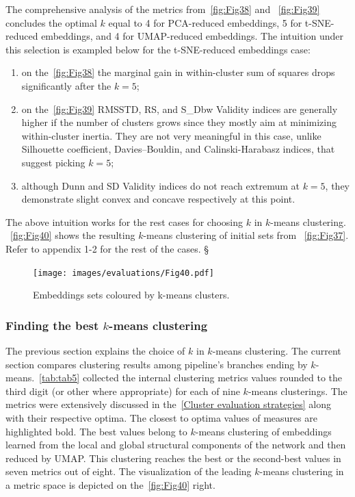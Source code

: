 The comprehensive analysis of the metrics from~\autoref{fig:Fig38} and ~\autoref{fig:Fig39} concludes the optimal $k$ equal to 4 for PCA-reduced embeddings, 5 for t-SNE-reduced embeddings, and 4 for UMAP-reduced embeddings. The intuition under this selection is exampled below for the t-SNE-reduced embeddings case:
\begin{enumerate}
    \item on the~\autoref{fig:Fig38} the marginal gain in within-cluster sum of squares drops significantly after the $k = 5$;
    \item on the~\autoref{fig:Fig39} RMSSTD, RS, and S\_Dbw Validity indices are generally higher if the number of clusters grows since they mostly aim at minimizing within-cluster inertia. They are not very meaningful in this case, unlike Silhouette coefficient, Davies–Bouldin, and Calinski-Harabasz indices, that suggest picking $k = 5$;
    \item although Dunn and SD Validity indices do not reach extremum at $k = 5$, they demonstrate slight convex and concave respectively at this point.
\end{enumerate}
The above intuition works for the rest cases for choosing $k$ in $k$-means clustering. ~\autoref{fig:Fig40} shows the resulting $k$-means clustering of initial sets from ~\autoref{fig:Fig37}. Refer to appendix 1-2 for the rest of the cases.  §
\begin{figure}[!ht]
	\centering
	\texttt{[image: images/evaluations/Fig40.pdf]}\\
	\caption{Embeddings sets coloured by k-means clusters.}
	\label{fig:Fig40}
\end{figure}
\subsubsection{Finding the best $k$-means clustering}
\label{Finding the best $k$-means clustering}
The previous section explains the choice of $k$ in $k$-means clustering. The current section compares clustering results among pipeline's branches ending by $k$-means.~\autoref{tab:tab5} collected the internal clustering metrics values rounded to the third digit (or other where appropriate) for each of nine $k$-means clusterings. The metrics were extensively discussed in the~\ref{Cluster evaluation strategies} along with their respective optima. The closest to optima values of measures are highlighted bold. The best values belong to $k$-means clustering of embeddings learned from the local and global structural components of the network and then reduced by UMAP. This clustering reaches the best or the second-best values in seven metrics out of eight. The visualization of the leading $k$-means clustering in a metric space is depicted on the~\autoref{fig:Fig40} right.

